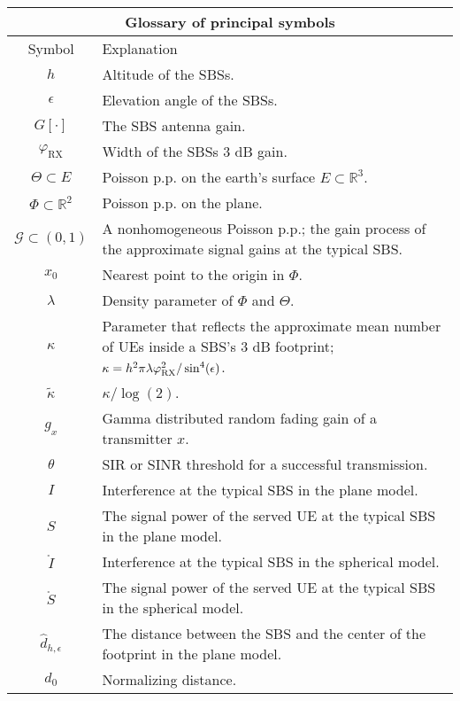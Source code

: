 \documentclass[conference]{IEEEtran}
\newcommand{\R}{\mathbb{R}}
\theoremstyle{definition}
\theoremstyle{plain}
\begin{document}
          \begin{table}
           \begin{center}
             \begin{tabular}{| c | p{7cm}  |}
               \hline
               \multicolumn{2}{|c|}{Glossary of principal symbols} \\
               \hline
               Symbol& Explanation 
               \\ 
               \hline
               $h$ & Altitude of the SBSs. \\
               $\epsilon$ & Elevation angle of the SBSs. \\
               $G[\cdot]$ & The SBS antenna gain.\\
               $\varphi_{\text{RX}}$ & Width of the SBSs $3$ dB gain. \\
               $\Theta \subset E $ & Poisson p.p. on the earth's surface $E \subset \R^3$. \\
               $\Phi \subset \R^2$ & Poisson p.p. on the plane. \\
                $\mathcal{G} \subset (0,1)$ & A nonhomogeneous Poisson p.p.; the gain process of the approximate signal gains at the typical SBS.  \\
               $x_0$ & Nearest point to the origin in $\Phi$.  \\
               $\lambda$ & Density parameter of $\Phi$ and $\Theta$. \\
               $\kappa$ & Parameter that reflects the approximate mean number of UEs inside a SBS's $3$ dB footprint;  $\kappa = h^2\pi \lambda \varphi_{\textup{RX}}^2/\sin^4(\epsilon)$. \\
               ${\tilde{\kappa}}$ &  $\kappa/\log(2)$.\\
               $g_x$ &   Gamma distributed random fading gain of a transmitter $x$.     \\
               $\theta$ & SIR or SINR threshold for a successful transmission.\\
               $I$ & Interference at the typical SBS in the plane model.\\
               $S$ & The signal power of the served UE at the typical SBS in the plane model.\\
               $\mathring{I}$ & Interference at the typical SBS in the spherical model.\\
               $\mathring{S}$ & The signal power of the served UE at the typical SBS in the spherical model.\\ 
               $\hat{d}_{h,\epsilon}$ & The distance between the SBS and the center of the footprint in the plane model.\\
               $d_{0}$ & Normalizing distance.  \\           
             
               \hline
             \end{tabular}
           \end{center}
         \end{table}   
\end{document}
